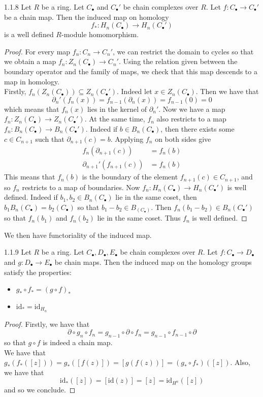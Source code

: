 \documentclass[a4paper]{article}
\begin{document}
\begin{lmm}{}{1.1.8} Let $R$ be a ring. Let $C_\bullet$ and $C_\bullet'$ be chain complexes over $R$. Let $f:C_\bullet\to C_\bullet'$ be a chain map. Then the induced map on homology $$f_\ast:H_n(C_\bullet)\to H_n(C_\bullet')$$ is a well defined $R$-module homomorphism. 
\begin{proof}
For every map $f_n:C_n\to C_n'$, we can restrict the domain to cycles so that we obtain a map $f_n:Z_n(C_\bullet)\to C_n'$. Using the relation given between the boundary operator and the family of maps, we check that this map descends to a map in homology. \\

Firstly, $f_n(Z_n(C_\bullet))\subseteq Z_n(C_\bullet')$. Indeed let $x\in Z_n(C_\bullet)$. Then we have that $$\partial_n'(f_n(x))=f_{n-1}(\partial_n(x))=f_{n-1}(0)=0$$ which means that $f_n(x)$ lies in the kernel of $\partial_n'$. Now we have a map $f_n:Z_n(C_\bullet)\to Z_n(C_\bullet')$. At the same time, $f_n$ also restricts to a map $f_n:B_n(C_\bullet)\to B_n(C_\bullet')$. Indeed if $b\in B_n(C_\bullet)$, then there exists some $c\in C_{n+1}$ such that $\partial_{n+1}(c)=b$. Applying $f_n$ on both sides give 
\begin{align*}
f_n(\partial_{n+1}(c))&=f_n(b)\\
\partial_{n+1}'(f_{n+1}(c))&=f_n(b)
\end{align*}
This means that $f_n(b)$ is the boundary of the element $f_{n+1}(c)\in C_{n+1}$, and so $f_n$ restricts to a map of boundaries. Now $f_n:H_n(C_\bullet)\to H_n(C_\bullet')$ is well defined. Indeed if $b_1,b_2\in B_n(C_\bullet)$ lie in the same coset, then $b_1B_n(C_\bullet)=b_2(C_\bullet)$ so that $b_1-b_2\in B_(C_\bullet)$. Then $f_n(b_1-b_2)\in B_n(C_\bullet')$ so that $f_n(b_1)$ and $f_n(b_2)$ lie in the same coset. Thus $f_n$ is well defined. 
\end{proof}
\end{lmm}

We then have functoriality of the induced map. 

\begin{prp}{}{1.1.9} Let $R$ be a ring. Let $C_\bullet,D_\bullet,E_\bullet$ be chain complexes over $R$. Let $f:C_\bullet\to D_\bullet$ and $g:D_\bullet\to E_\bullet$ be chain maps. Then the induced map on the homology groups satisfy the properties: 
\begin{itemize}
\item $g_\ast\circ f_\ast=(g\circ f)_\ast$
\item $\text{id}_\ast=\text{id}_{H_n}$
\end{itemize} 
\begin{proof}
Firstly, we have that $$\partial\circ g_n\circ f_n=g_{n-1}\circ\partial\circ f_n=g_{n-1}\circ f_{n-1}\circ\partial$$ so that $g\circ f$ is indeed a chain map. \\

We have that $g_\ast(f_\ast([z]))=g_\ast([f(z)])=[g(f(z))]=(g_\ast\circ f_\ast)([z])$. Also, we have that $$\text{id}_\ast([z])=[\text{id}(z)]=[z]=\text{id}_{H^n}([z])$$ and so we conclude. 
\end{proof}
\end{prp}
\end{document}
